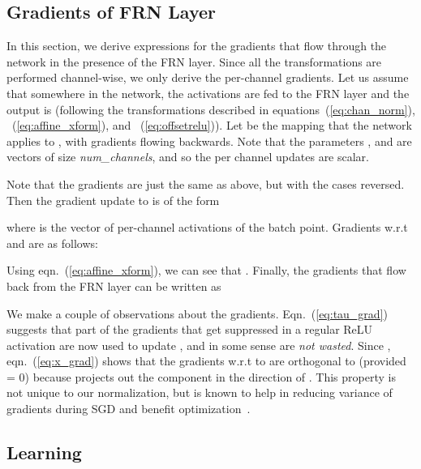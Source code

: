 \documentclass[10pt,twocolumn,letterpaper]{article}
\newcommand{\papername}{FRN}
\begin{document}
\subsection{Gradients of \papername{} Layer}
\label{sec:gradients}

In this section, we derive expressions for the gradients that flow through the network in the presence of the \papername{} layer. Since all the transformations are performed channel-wise, we only derive the per-channel gradients. Let us assume that somewhere in the network, the activations  are fed to the \papername{} layer and the output is  (following the transformations described in equations~(\ref{eq:chan_norm}), ~(\ref{eq:affine_xform}), and ~(\ref{eq:offsetrelu})). Let  be the mapping that the network applies to , with gradients  flowing backwards. Note that the parameters ,  and  are vectors of size \emph{num\_channels}, and so the per channel updates are scalar.

Note that the gradients  are just the same as above, but with the cases reversed. Then the gradient update to  is of the form

where  is the vector of per-channel activations of the  batch point. Gradients w.r.t  and  are as follows:

Using eqn.~(\ref{eq:affine_xform}), we can see that . Finally, the gradients that flow back from the \papername{} layer can be written as

We make a couple of observations about the gradients. Eqn.~(\ref{eq:tau_grad}) suggests that part of the gradients that get suppressed in a regular ReLU activation are now used to update , and in some sense are \emph{not wasted}. Since ,  eqn.~(\ref{eq:x_grad}) shows that the gradients w.r.t to  are orthogonal to  (provided  = 0) because  projects out the component in the direction of . This property is not unique to our normalization, but is known to help in reducing variance of gradients during SGD and benefit optimization~\cite{salimans2016weight}.

\subsection{Learning }
\label{sec:learned_eps}
\end{document}

